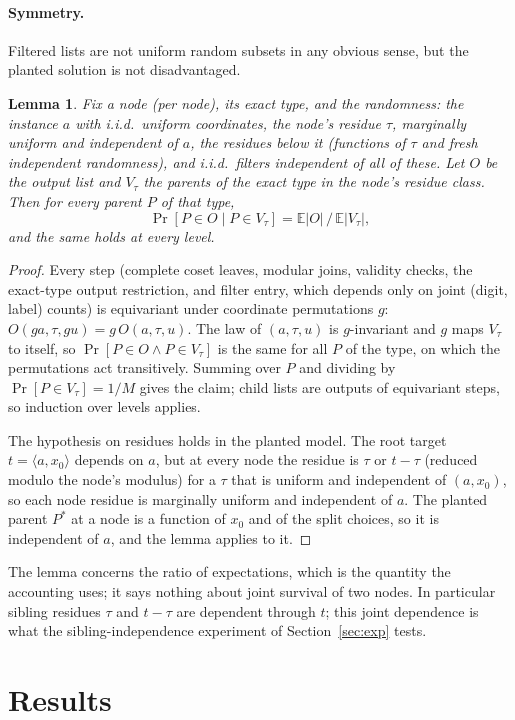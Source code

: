\documentclass[11pt]{article}
\newtheorem{lemma}[theorem]{Lemma}
\theoremstyle{definition}
\theoremstyle{remark}
\begin{document}
\paragraph{Symmetry.} Filtered lists are not uniform random subsets in any obvious sense, but the planted solution is
not disadvantaged.

\begin{lemma}\label{lem:sym}
Fix a node (per node), its exact type, and the randomness: the instance $a$ with i.i.d.\ uniform coordinates, the
node's residue $\tau$, marginally uniform and independent of $a$, the residues below it (functions of $\tau$ and fresh
independent randomness), and i.i.d.\ filters independent of all of these. Let $O$ be the output list and $V_\tau$ the parents
of the exact type in the node's residue class. Then for every parent $P$ of that type,
\[
\Pr[P\in O\mid P\in V_\tau]=\mathbb{E}|O|\,/\,\mathbb{E}|V_\tau| ,
\]
and the same holds at every level.
\end{lemma}
\begin{proof}
Every step (complete coset leaves, modular joins, validity checks, the exact-type output restriction, and filter
entry, which depends only on joint (digit, label) counts) is equivariant under coordinate permutations $g$:
$O(g a,\tau,g u)=g\,O(a,\tau,u)$. The law of $(a,\tau,u)$ is $g$-invariant and $g$ maps $V_\tau$ to itself, so
$\Pr[P\in O\wedge P\in V_\tau]$ is the same for all $P$ of the type, on which the permutations act transitively.
Summing over $P$ and dividing by $\Pr[P\in V_\tau]=1/M$ gives the claim; child lists are outputs of equivariant steps,
so induction over levels applies.

The hypothesis on residues holds in the planted model. The root target $t=\langle a,x_0\rangle$ depends on $a$, but at
every node the residue is $\tau$ or $t-\tau$ (reduced modulo the node's modulus) for a $\tau$ that is uniform and
independent of $(a,x_0)$, so each node residue is marginally uniform and independent of $a$. The planted parent $P^*$
at a node is a function of $x_0$ and of the split choices, so it is independent of $a$, and the lemma applies to it.
\end{proof}
The lemma concerns the ratio of expectations, which is the quantity the accounting uses; it says nothing about joint
survival of two nodes. In particular sibling residues $\tau$ and $t-\tau$ are dependent through $t$; this joint
dependence is what the sibling-independence experiment of Section~\ref{sec:exp} tests.

\section{Results}\label{sec:results}
\begin{table}[ht]
\centering

\caption{Time exponents by depth $d$, BBSS accounting, plain and filtered merges (each entry is the best found; a
deeper tree can copy a shallower one exactly, by a bottom level of trivial splits $z\to(z,0)$ with an
unfiltered merge, so entries are monotone). $\{0,1\}$ and $\{-1,0,1\}$ under BBSS accounting give
$0.3371$ and $0.2891$; the strict accounting of~\cite{HGJ10,BCJ11} gives $0.3371$ and $0.2909$.}
\label{tab:depth}
\end{table}
\end{document}
